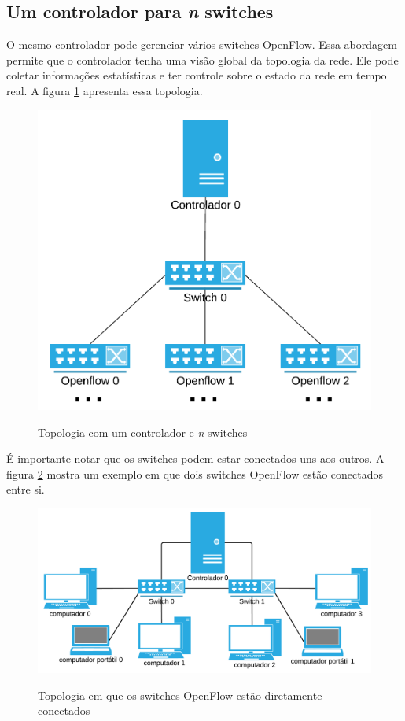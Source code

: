 \subsection{Um controlador para \emph{n} switches}

O mesmo controlador pode gerenciar vários switches OpenFlow.
Essa abordagem permite que o controlador tenha uma visão global da topologia
da rede.
Ele pode coletar informações estatísticas e ter controle sobre o estado 
da rede em tempo real.
A figura \ref{fig:controller-n-switches} apresenta essa topologia.

\begin{figure}[h!]
    \centering
    \includegraphics[scale=0.85]{img/controller-n-switches}
    \label{fig:controller-n-switches}
    \caption{Topologia com um controlador e \emph{n} switches}
\end{figure}

É importante notar que os switches podem estar conectados uns aos outros.
A figura \ref{fig:controller-n-linked-switches} mostra um exemplo em que 
dois switches OpenFlow estão conectados entre si.

\begin{figure}[h!]
    \centering
    \includegraphics[scale=0.8]{img/controller-n-linked-switches}
    \label{fig:controller-n-linked-switches}
    \caption{Topologia em que os switches OpenFlow 
    estão diretamente conectados}
\end{figure}



